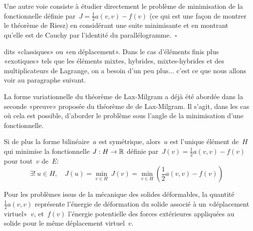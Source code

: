 \begin{demonstration}\footnotesize{}
Une autre voie consiste à étudier directement le problème de minimisation de la fonctionnelle définie par~$J=\tfrac12 a(v,v)-f(v)$ (ce qui est une façon de montrer le théorème de Riesz) en considérant une suite minimisante et en montrant qu'elle est de Cauchy par l'identité du parallélogramme.~$\square$
\end{demonstration}

\medskip
{} dits «classiques» ou «en déplacement». Dans le cas d'éléments finis plus «exotiques» tels que les éléments mixtes, hybrides, mixtes-hybrides et des multiplicateurs de Lagrange, on a besoin d'un peu plus... c'est ce que nous allons voir au paragraphe suivant.

\medskip
La forme variationnelle du théorème de Lax-Milgram a déjà été abordée dans la seconde «preuve» proposée du théorème de de Lax-Milgram. Il s'agit, dans les cas où cela est possible, d'aborder le problème sous l'angle de la minimisation d'une fonctionnelle.
\medskipvm
\begin{theoreme}
Si de plus la forme bilinéaire~$a$ est symétrique, alors~$u$ est l'unique élément de~$H$ qui minimise la fonctionnelle
$J: H\rightarrow\mathbb R$ définie par~$J(v) = \frac12 a(v,v)-f(v)$ pour tout~$v$ de~$E$:
\begin{equation}
\exists!\ u \in H,\quad J(u) = \min_{v\in H}\ J(v) = \min_{v\in H} \left( \frac12 a(v,v) - f(v) \right)
\end{equation}
\end{theoreme}

\medskip
{}
Pour les problèmes issus de la mécanique des solides déformables, la quantité~$\frac12 a(v,v)$ représente l'énergie de déformation du solide associé à un «déplacement virtuel»~$v$, et~$f(v)$ l'énergie potentielle des forces extérieures appliquées au solide pour le même déplacement virtuel~$v$.


